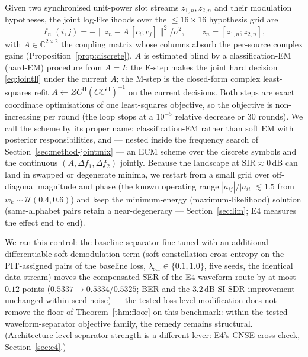 \documentclass[journal]{IEEEtran}
\newcommand{\sir}{\mathrm{SIR}}
\begin{document}
Given two synchronised unit-power slot streams $z_{1,n}, z_{2,n}$ and
their modulation hypotheses, the joint log-likelihoods over the
$\leq 16 \times 16$ hypothesis grid are
\begin{equation}
  \ell_n(i, j) = -\big\| z_n - A \, [c_i; c_j] \big\|^2 / \sigma^2,
  \qquad z_n = [z_{1,n}; z_{2,n}],
  \label{eq:jointll}
\end{equation}
with $A \in \mathbb{C}^{2 \times 2}$ the coupling matrix whose columns
absorb the per-source complex gains (Proposition~\ref{prop:discrete}).
$A$ is estimated blind by a classification-EM (hard-EM) procedure from
$A = I$: the E-step makes the joint hard decision \eqref{eq:jointll}
under the current $A$; the M-step is the closed-form complex
least-squares refit $A \leftarrow Z C^{\mathsf{H}}
(C C^{\mathsf{H}})^{-1}$ on the current decisions. Both steps are exact
coordinate optimisations of one least-squares objective, so the
objective is non-increasing per
round (the loop stops at a $10^{-5}$ relative decrease or $30$ rounds).
We call the scheme by its proper
name: classification-EM rather than soft EM with posterior
responsibilities, and --- nested inside the frequency search of
Section~\ref{sec:method-jointmix} --- an ECM
scheme over the discrete symbols and the continuous
$(A, \Delta f_1, \Delta f_2)$ jointly. Because the landscape at
$\sir \approx 0$\,dB can land in swapped or degenerate
minima, we restart from a small grid over off-diagonal magnitude and
phase (the known operating range $|a_{ij}|/|a_{ii}| \lesssim 1.5$ from
$w_k \sim \mathcal{U}(0.4,0.6)$) and keep the minimum-energy
(maximum-likelihood) solution (same-alphabet pairs retain a near-degeneracy ---
Section~\ref{sec:lim}; E4 measures the effect end to end).

We ran this control: the baseline separator fine-tuned with an
additional differentiable soft-demodulation term (soft constellation
cross-entropy on the PIT-assigned pairs of the baseline loss,
$\lambda_{\mathrm{ser}} \in \{0.1, 1.0\}$, five seeds, the identical
data stream) moves the compensated SER of the E4 waveform route
by at most $0.12$ points ($0.5337 \to 0.5334$/$0.5325$; BER and the
$3.2$\,dB SI-SDR improvement unchanged within seed noise) --- the
tested loss-level modification does not remove the floor of
Theorem~\ref{thm:floor} on this benchmark: within the tested
waveform-separator objective family, the remedy remains structural.
(Architecture-level separator strength is a different lever: E4's CNSE
cross-check, Section~\ref{sec:e4}.)

\end{document}
